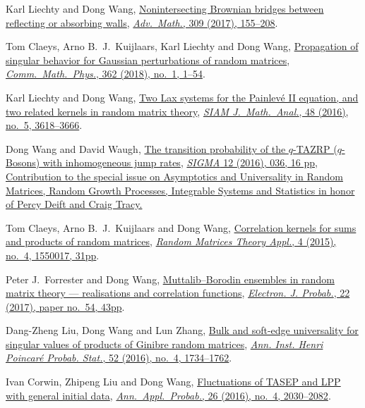 \begin{etaremune}
  Karl Liechty and Dong Wang, \href{http://arxiv.org/abs/1608.08712}{Nonintersecting Brownian bridges between reflecting or absorbing walls}, \href{https://doi.org/10.1016/j.aim.2016.10.024}{\textit{Adv.\ Math.}, 309 (2017), 155--208}.
\item
  Tom Claeys, Arno B.~J.~Kuijlaars, Karl Liechty and Dong Wang, \href{http://arxiv.org/abs/1608.05870}{Propagation of singular behavior for Gaussian perturbations of random matrices}, \href{https://doi.org/10.1007/s00220-018-3195-8}{\textit{Comm.\ Math.\ Phys.}, 362 (2018), no.\ 1, 1--54}.
\item
  Karl Liechty and Dong Wang, \href{http://arxiv.org/abs/1601.01603}{Two Lax systems for the Painlev\'{e} II equation, and two related kernels in random matrix theory}, \href{https://doi.org/10.1137/16M1056080}{\textit{SIAM J.\ Math.\ Anal.}, 48 (2016), no.\ 5, 3618--3666}.
\item
  Dong Wang and David Waugh, \href{http://arxiv.org/abs/1512.01612}{The transition probability of the $q$-TAZRP ($q$-Bosons) with inhomogeneous jump rates}, \href{https://doi.org/10.3842/SIGMA.2016.037}{\textit{SIGMA} 12 (2016), 036, 16 pp, Contribution to the special issue on Asymptotics and Universality in Random Matrices, Random Growth Processes, Integrable Systems and Statistics in honor of Percy Deift and Craig Tracy.}
\item 
  Tom Claeys, Arno B.~J.~Kuijlaars and Dong Wang, \href{http://arxiv.org/abs/1505.00610}{Correlation kernels for sums and products of random matrices}, \href{https://doi.org/10.1142/S2010326315500173}{\textit{Random Matrices Theory Appl.}, 4 (2015), no.\ 4, 1550017, 31pp}.
\item
  Peter J.~Forrester and Dong Wang, \href{http://arxiv.org/abs/1502.07147}{Muttalib--Borodin ensembles in random matrix theory --- realisations and correlation functions}, \href{https://doi.org/10.1214/17-EJP62}{\textit{Electron. J. Probab.}, 22 (2017), paper no.\ 54, 43pp}.
\item
  Dang-Zheng Liu, Dong Wang and Lun Zhang, \href{http://arxiv.org/abs/1412.6777}{Bulk and soft-edge universality for singular values of products of Ginibre random matrices}, \href{https://doi.org/10.1214/15-AIHP696}{\textit{Ann. Inst. Henri Poincar\'e Probab. Stat.}, 52 (2016), no.\ 4, 1734--1762}.
\item
  Ivan Corwin, Zhipeng Liu and Dong Wang, \href{http://arxiv.org/abs/1412.5087}{Fluctuations of TASEP and LPP with general initial data}, \href{https://doi.org/10.1214/15-AAP1139}{\textit{Ann.\ Appl.\ Probab.}, 26 (2016), no.\ 4, 2030--2082}.

\end{etaremune}
